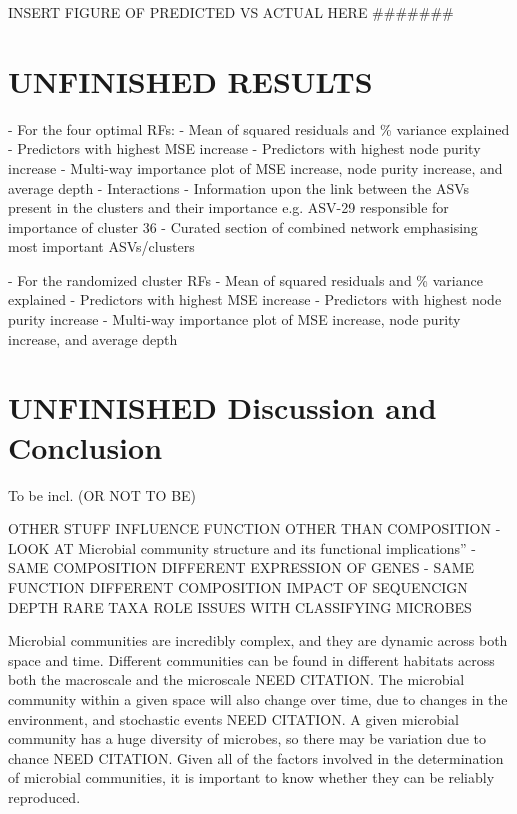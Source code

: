 \documentclass[11pt]{article}
\begin{document}
INSERT FIGURE OF PREDICTED VS ACTUAL HERE #######




\section{UNFINISHED RESULTS}

    
- For the four optimal RFs:
    - Mean of squared residuals and \% variance explained
    - Predictors with highest MSE increase
    - Predictors with highest node purity increase
    - Multi-way importance plot of MSE increase, node purity increase, and average depth
    - Interactions
    - Information upon the link between the ASVs present in the clusters and their importance e.g. ASV-29 responsible for importance of cluster 36
    - Curated section of combined network emphasising most important ASVs/clusters

- For the randomized cluster RFs
    - Mean of squared residuals and \% variance explained
    - Predictors with highest MSE increase
    - Predictors with highest node purity increase
    - Multi-way importance plot of MSE increase, node purity increase, and average depth

\section{UNFINISHED Discussion and Conclusion}

To be incl. (OR NOT TO BE)

OTHER STUFF INFLUENCE FUNCTION OTHER THAN COMPOSITION - LOOK AT Microbial community structure and its functional implications”
- SAME COMPOSITION DIFFERENT EXPRESSION OF GENES
- SAME FUNCTION DIFFERENT COMPOSITION
IMPACT OF SEQUENCIGN DEPTH
RARE TAXA ROLE
ISSUES WITH CLASSIFYING MICROBES

Microbial communities are incredibly complex, and they are dynamic across both space and time. Different communities can be found in different habitats across both the macroscale and the microscale NEED CITATION.
The microbial community within a given space will also change over time, due to changes in the environment, and stochastic events NEED CITATION.
A given microbial community has a huge diversity of microbes, so there may be variation due to chance NEED CITATION.
Given all of the factors involved in the determination of microbial communities, it is important to know whether they can be reliably reproduced.
\end{document}
